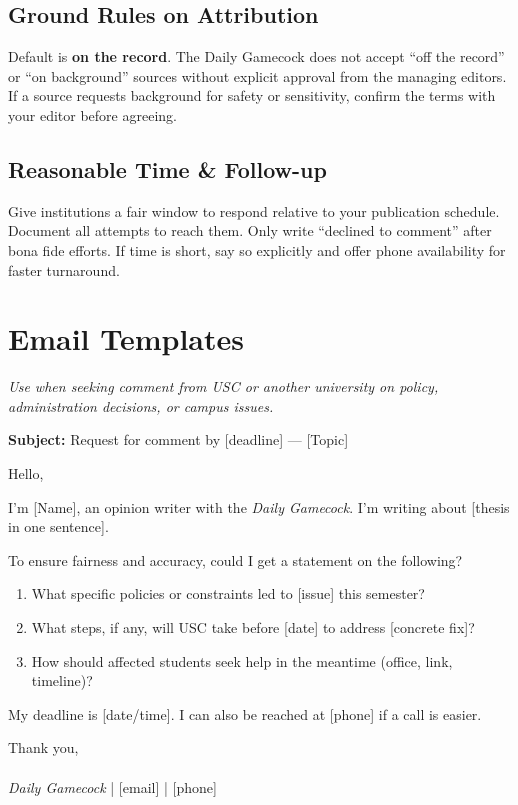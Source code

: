 \documentclass[12pt]{article}
\newcommand{\key}[1]{\textbf{#1}}
\begin{document}
\subsection*{Ground Rules on Attribution}
Default is \key{on the record}. The Daily Gamecock does not accept ``off the record'' or ``on background'' sources without explicit approval from the managing editors. If a source requests background for safety or sensitivity, confirm the terms with your editor before agreeing.

\subsection*{Reasonable Time \& Follow-up}
Give institutions a fair window to respond relative to your publication schedule. Document all attempts to reach them. Only write ``declined to comment'' after bona fide efforts. If time is short, say so explicitly and offer phone availability for faster turnaround.

\section{Email Templates}

\begin{templatebox}
\emph{Use when seeking comment from USC or another university on policy, administration decisions, or campus issues.}

\textbf{Subject:} Request for comment by [deadline] --- [Topic]

Hello,

I'm [Name], an opinion writer with the \emph{Daily Gamecock}. I'm writing about [thesis in one sentence].

To ensure fairness and accuracy, could I get a statement on the following?

\begin{enumerate}[label=\arabic*.]
  \item What specific policies or constraints led to [issue] this semester?
  \item What steps, if any, will USC take before [date] to address [concrete fix]?
  \item How should affected students seek help in the meantime (office, link, timeline)?
\end{enumerate}

My deadline is [date/time]. I can also be reached at [phone] if a call is easier.

Thank you,\\
[Name]\\
\emph{Daily Gamecock} | [email] | [phone]
\end{templatebox}
\end{document}
